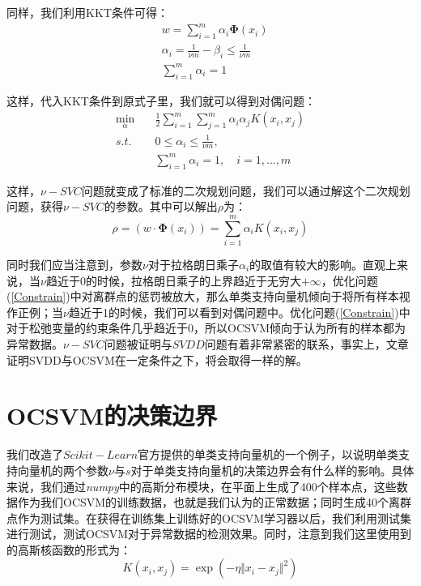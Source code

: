 \documentclass[UTF8, 12pt]{ctexart}
\begin{document}
同样，我们利用KKT条件可得：
\begin{align}
	& w = \sum_{i=1}^{m} \alpha_{i}\boldsymbol{\Phi}(x_{i}) \\
	& \alpha_{i} = \frac{1}{\nu m} - \beta_{i} \leq \frac{1}{\nu m} \\
	& \sum_{i=1}^{m} \alpha_{i} = 1
\end{align}

这样，代入KKT条件到原式子里，我们就可以得到对偶问题：
\begin{align}
	\min_{\alpha} &  \quad \frac{1}{2}\sum_{i=1}^{m} \sum_{j=1}^{m} \alpha_{i} \alpha_{j} K(x_{i}, x_{j})  \\
	s.t. &  \quad 0 \leq \alpha_{i} \leq \frac{1}{\nu m},\\
	{} & \quad \sum_{i=1}^{m} \alpha_{i} = 1, \quad i=1,...,m
\end{align}

这样，$\nu-SVC$问题就变成了标准的二次规划问题，我们可以通过解这个二次规划问题，获得$\nu-SVC$的参数。其中可以解出$\rho$为：
\begin{equation}
	\rho = (w·\boldsymbol{\Phi}(x_{i})) = \sum_{i=1}^{m} \alpha_{i} K(x_{i}, x_{j})
\end{equation}

同时我们应当注意到，参数$\nu$对于拉格朗日乘子$\alpha_{i}$的取值有较大的影响。直观上来说，当$\nu$趋近于0的时候，拉格朗日乘子的上界趋近于无穷大$+\infty$，优化问题(\ref{Constrain})中对离群点的惩罚被放大，那么单类支持向量机倾向于将所有样本视作正例；当$\nu$趋近于1的时候，我们可以看到对偶问题中。优化问题(\ref{Constrain})中对于松弛变量的约束条件几乎趋近于0，所以OCSVM倾向于认为所有的样本都为异常数据。$\nu-SVC$问题被证明与$SVDD$问题有着非常紧密的联系，事实上，文章证明SVDD与OCSVM在一定条件之下，将会取得一样的解。

\section{OCSVM的决策边界}
我们改造了$Scikit-Learn$官方提供的单类支持向量机的一个例子，以说明单类支持向量机的两个参数$\nu$与$s$对于单类支持向量机的决策边界会有什么样的影响。具体来说，我们通过\emph{numpy}中的高斯分布模块，在平面上生成了400个样本点，这些数据作为我们OCSVM的训练数据，也就是我们认为的正常数据；同时生成40个离群点作为测试集。在获得在训练集上训练好的OCSVM学习器以后，我们利用测试集进行测试，测试OCSVM对于异常数据的检测效果。同时，注意到我们这里使用到的高斯核函数的形式为：
\begin{equation}
	K(x_{i}, x_{j}) = \exp({-{\eta}{\Vert x_{i} - x_{j} \Vert}^{2}})
\end{equation}
\end{document}
